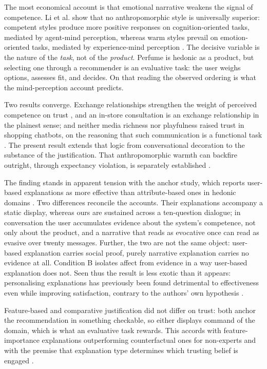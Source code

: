 \documentclass[conference]{IEEEtran}
\begin{document}
The most economical account is that emotional narrative weakens the signal of competence.
Li et al. show that no anthropomorphic style is universally superior: competent styles
produce more positive responses on cognition-oriented tasks, mediated by agent-mind
perception, whereas warm styles prevail on emotion-oriented tasks, mediated by
experience-mind perception \cite{libaoku2024}. The decisive variable is the nature of the
\textit{task}, not of the \textit{product}. Perfume is hedonic as a product, but selecting
one through a recommender is an evaluative task: the user weighs options, assesses fit, and
decides. On that reading the observed ordering is what the mind-perception account
predicts.

Two results converge. Exchange relationships strengthen the weight of perceived competence
on trust \cite{cheng2022}, and an in-store consultation is an exchange relationship in the
plainest sense; and neither media richness nor playfulness raised trust in shopping
chatbots, on the reasoning that such communication is a functional task \cite{yen2021}. The
present result extends that logic from conversational decoration to the substance of the
justification. That anthropomorphic warmth can backfire outright, through expectancy
violation, is separately established \cite{crolic2022}.

The finding stands in apparent tension with the anchor study, which reports user-based
explanations as more effective than attribute-based ones in hedonic domains
\cite{chen2024}. Two differences reconcile the accounts. Their explanations accompany a
static display, whereas ours are sustained across a ten-question dialogue; in conversation
the user accumulates evidence about the system's competence, not only about the product,
and a narrative that reads as evocative once can read as evasive over twenty messages.
Further, the two are not the same object: user-based explanation carries social proof,
purely narrative explanation carries no evidence at all. Condition B isolates affect from
evidence in a way user-based explanation does not. Seen thus the result is less exotic than
it appears: personalising explanations has previously been found detrimental to
effectiveness even while improving satisfaction, contrary to the authors' own hypothesis
\cite{tintarev2012}.

Feature-based and comparative justification did not differ on trust: both anchor the
recommendation in something checkable, so either displays command of the domain, which is
what an evaluative task rewards. This accords with feature-importance explanations
outperforming counterfactual ones for non-experts \cite{brito2023} and with the premise
that explanation type determines which trusting belief is engaged \cite{wang2007}.
\end{document}
